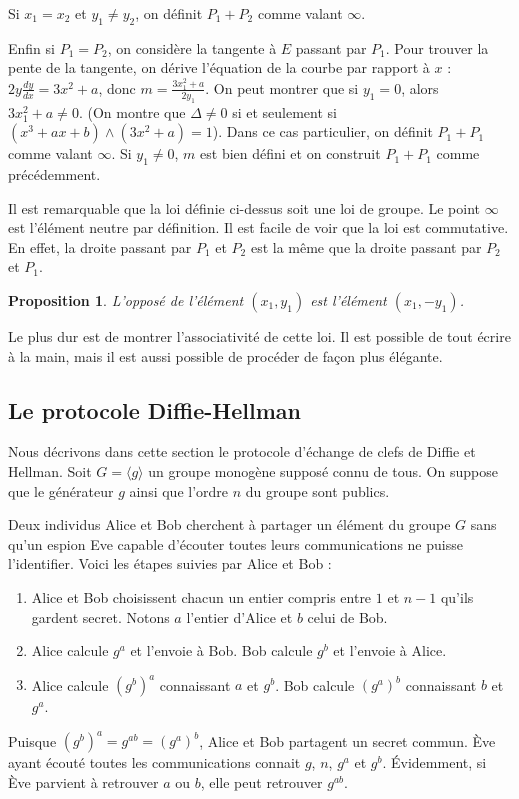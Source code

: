 \documentclass{article}
\theoremstyle{plain}%
\newtheorem{prop}[thm]{Proposition}
\theoremstyle{definition}%
\begin{document}
Si $x_1=x_2$ et $y_1\neq y_2$, on définit $P_1+P_2$ comme valant $\infty$.

Enfin si $P_1 = P_2$, on considère la tangente à $E$ passant par $P_1$. Pour trouver la pente de la tangente, on dérive l'équation de la courbe par rapport à $x$ : $2y\frac{dy}{dx} = 3x^2 + a$, donc $m = \frac{3x_1^2 + a}{2y_1}$. On peut montrer que si $y_1 = 0$, alors $3x_1^2 + a \neq 0$. 
(On montre que $\Delta \neq 0$ si et seulement si $(x^3 + ax + b)\wedge(3x^2 + a) = 1$). 
Dans ce cas particulier, on définit $P_1+P_1$ comme valant $\infty$.
Si  $y_1 \neq  0$, $m$ est bien défini et on construit $P_1+P_1$ comme précédemment.

Il est remarquable que la loi définie ci-dessus soit une loi de groupe. Le point $\infty$ est l'élément neutre par définition. Il est facile de voir que la loi est commutative. En effet, la droite passant par $P_1$ et $P_2$ est la même que la droite passant par $P_2$ et $P_1$.

\begin{prop}
  \label{opposé}
L'opposé de l'élément $(x_1, y_1)$ est l'élément $(x_1, -y_1)$.
\end{prop}

Le plus dur est de montrer l'associativité de cette loi. Il est possible de tout écrire à la main, mais il est aussi possible de procéder de façon plus élégante.


\subsection{Le protocole Diffie-Hellman}


Nous décrivons dans cette section le protocole d'échange de clefs de Diffie et Hellman. 
Soit $G = \langle g \rangle$ un groupe monogène supposé connu de tous. On suppose que le générateur $g$ ainsi que l'ordre $n$ du groupe sont publics.

Deux individus Alice et Bob cherchent à partager un élément du groupe $G$ sans qu'un espion Eve capable d'écouter toutes leurs communications ne puisse l'identifier. Voici les étapes suivies par Alice et Bob :
\begin{enumerate}
  \item Alice et Bob choisissent chacun un entier compris entre $1$ et $n-1$ qu'ils gardent secret. Notons $a$ l'entier d'Alice et $b$ celui de Bob.
  \item Alice calcule $g^a$ et l'envoie à Bob. Bob calcule $g^b$ et l'envoie à Alice.
  \item Alice calcule $(g^b)^a$ connaissant $a$ et $g^b$. Bob calcule $(g^a)^b$ connaissant $b$ et $g^a$.
\end{enumerate}
Puisque $(g^b)^a = g^{ab} = (g^a)^b$, Alice et Bob partagent un secret commun. Ève ayant écouté toutes les communications connait $g$, $n$, $g^a$ et $g^b$. Évidemment, si Ève parvient à retrouver $a$ ou $b$, elle peut retrouver $g^{ab}$. 
\end{document}

